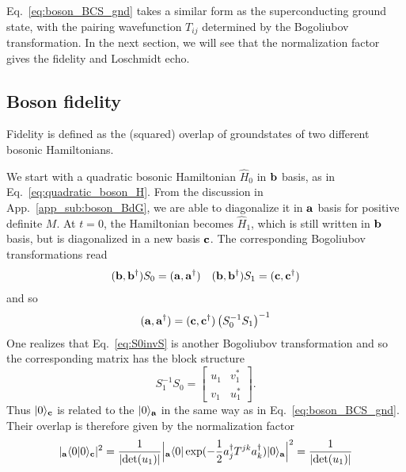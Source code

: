 Eq.~\eqref{eq:boson_BCS_gnd} takes a similar form as the superconducting ground state, with the pairing wavefunction $T_{ij}$ determined by the Bogoliubov transformation. In the next section, we will see that the normalization factor gives the fidelity and Loschmidt echo.

\subsection{Boson fidelity} 
\label{app_sub:boson_fidelity}

Fidelity is defined as the (squared) overlap of groundstates of two different bosonic Hamiltonians. 

We start with a quadratic bosonic Hamiltonian $\hat{H}_0$ in ${\bf b}$ basis, as in Eq.~\eqref{eq:quadratic_boson_H}. From the discussion in App.~\ref{app_sub:boson_BdG}, we are able to diagonalize it in ${\bf a}$ basis for positive definite $M$. At $t=0$, the Hamiltonian becomes $\hat{H}_1$, which is still written in ${\bf b}$ basis, but is diagonalized in a new basis ${\bf c}$. The corresponding Bogoliubov transformations read
\begin{equation}\begin{aligned}
\label{eq:two_BdG}
({\bf b} , {\bf b}^\dagger)S_0=({\bf a} , {\bf a}^\dagger)\quad
({\bf b} , {\bf b}^\dagger)S_1=({\bf c} , {\bf c}^\dagger)
\end{aligned}\end{equation}
and so
\begin{equation}\begin{aligned}
\label{eq:S0invS}
({\bf a} , {\bf a}^\dagger)=({\bf c} , {\bf c}^\dagger)\left(S_0^{-1}S_1\right)^{-1}
\end{aligned}\end{equation}
One realizes that Eq.~\eqref{eq:S0invS} is another Bogoliubov transformation and so the corresponding matrix has the block structure
\begin{equation}
S_1^{-1}S_0=\begin{bmatrix}
u_1 & v_1^*\\
v_1 & u_1^*
\end{bmatrix}.
\end{equation}
Thus $|0\rangle_{\bf c}$ is related to the $|0\rangle_{{\bf a}}$ in the same way as in Eq.~\eqref{eq:boson_BCS_gnd}. Their overlap is therefore given by the normalization factor
\begin{equation}\begin{aligned}
|{}_{\bf a}\langle0|0\rangle_{\bf c}|^2=\frac{1}{|\text{det}(u_1)|} \Big|{}_{\bf a}\langle 0 | \exp( -\frac{1}{2} a_j^{\dagger} T^{jk} a_k^{\dagger} )|0   \rangle_{\bf a} \Big|^2   = \frac{1}{|\text{det}(u_1)|}
\end{aligned}\end{equation}

